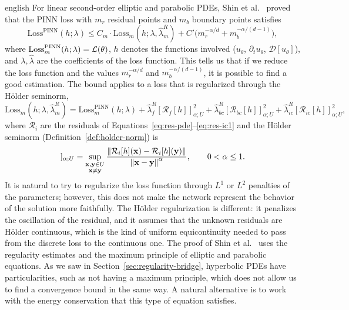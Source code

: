 \documentclass[../0000.tex]{subfiles}
\begin{document}
\begin{hyphenrules}{english}
For linear second-order elliptic and parabolic PDEs, Shin et al.~\cite{shin2020convergence} proved that the
PINN loss with $m_r$ residual points and $m_b$ boundary points satisfies
\begin{equation}
  \mathrm{Loss}^{\mathrm{PINN}}(h;\lambda)\le C_m\cdot\mathrm{Loss}_m(h;\lambda,\hat\lambda^{R}_m)
  +C'\big(m_r^{-\alpha/d}+m_b^{-\alpha/(d-1)}\big),
  \label{eq:shin-bound}
\end{equation}
where $\mathrm{Loss}^{\mathrm{PINN}}_m(h;\lambda)=\mathcal{L}(\theta)$, $h$ denotes the functions involved
($u_\theta$, $\partial_t u_\theta$, $\mathcal{D}[u_\theta]$), and $\lambda,\hat\lambda$ are the
coefficients of the loss function.
This tells us that if we reduce the loss function and the values $m_r^{-\alpha/d}$ and
$m_b^{-\alpha/(d-1)}$, it is possible to find a good estimation. The bound applies to a loss that is
regularized through the Hölder seminorm,
\begin{equation}
  \mathrm{Loss}_m(h;\lambda,\hat\lambda^{R}_m)=\mathrm{Loss}^{\mathrm{PINN}}_m(h;\lambda)
  +\hat\lambda^{R}_f[\mathcal{R}_f[h]]^2_{\alpha;U}+\hat\lambda^{R}_{bc}[\mathcal{R}_{bc}[h]]^2_{\alpha;U}
  +\hat\lambda^{R}_{ic}[\mathcal{R}_{ic}[h]]^2_{\alpha;U},
  \label{eq:shin-regularized}
\end{equation}
where $\mathcal{R}_i$ are the residuals of Equations~\eqref{eq:res-pde}--\eqref{eq:res-ic1} and the Hölder seminorm
(Definition~\ref{def:holder-norm}) is
\begin{equation}
  [\mathcal{R}_i[h]]_{\alpha;U}=\sup_{\substack{\mathbf{x},\mathbf{y}\in U\\ \mathbf{x}\neq\mathbf{y}}}
  \frac{\norm{\mathcal{R}_i[h](\mathbf{x})-\mathcal{R}_i[h](\mathbf{y})}}{\norm{\mathbf{x}-\mathbf{y}}^{\alpha}},\qquad0<\alpha\le1.
  \label{eq:holder-seminorm-loss}
\end{equation}
It is natural to try to regularize the loss function through $L^1$ or $L^2$ penalties of the
parameters; however, this does not make the network represent the behavior of the solution more
faithfully. The Hölder regularization is different: it penalizes the oscillation of the residual, and it
assumes that the unknown residuals are Hölder continuous, which is the kind of uniform equicontinuity
needed to pass from the discrete loss to the continuous one. The proof of Shin et al.~\cite{shin2020convergence}
uses the regularity estimates and the maximum principle of elliptic and parabolic equations. As we saw
in Section~\ref{sec:regularity-bridge}, hyperbolic PDEs have particularities, such as not having a maximum
principle, which does not allow us to find a convergence bound in the same way. A natural alternative is
to work with the energy conservation that this type of equation satisfies.


\end{hyphenrules}
\end{document}
